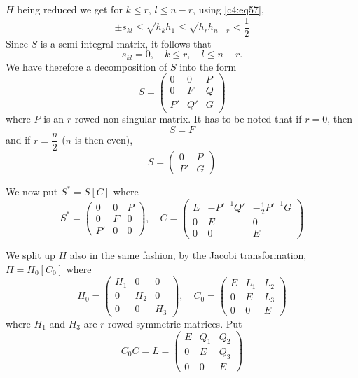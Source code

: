 $H$ being reduced we get for $k\leq r$, $l\leq n-r$, using \eqref{c4:eq57},
\begin{equation*}
\pm s_{kl}\leq \sqrt{h_{k}h_{1}}\leq
\sqrt{h_{r}h_{n-r}}<\frac{1}{2}\tag{58}\label{c4:eq58} 
\end{equation*}
Since $S$ is a semi-integral matrix, it follows that
$$
s_{kl}=0,\quad k\leq r,\quad l\leq n-r.
$$
We have therefore a decomposition of $S$ into the form
\begin{equation*}
S=
\begin{pmatrix}
0 & 0 & P\\
0 & F & Q\\
P' & Q' & G
\end{pmatrix}\tag{59}\label{c4:eq59}
\end{equation*}
where $P$ is an $r$-rowed non-singular matrix. It has to be noted that
if $r=0$, then
\begin{equation*}
S=F\tag{60}\label{c4:eq60}
\end{equation*}
and if $r=\dfrac{n}{2}$ ($n$ is then even),
\begin{equation*}
S=
\begin{pmatrix}
0 & P\\
P' & G
\end{pmatrix}\tag{61}\label{c4:eq61}
\end{equation*}\pageoriginale

We now put $S^{\ast}=S[C]$ where
\begin{equation*}
S^{\ast}=
\begin{pmatrix}
0 & 0 & P\\
0 & F & 0\\
P' & 0 & 0
\end{pmatrix},\quad
C=
\begin{pmatrix}
E & -{P'}^{-1}Q' & -\frac{1}{2}{P'}^{-1}G\\
0 & E & 0\\
0 & 0 & E
\end{pmatrix}\tag{62}\label{c4:eq62}
\end{equation*}

We split up $H$ also in the same fashion, by the Jacobi
transformation, $H=H_{0}[C_{0}]$ where
\begin{equation*}
H_{0}=
\begin{pmatrix}
H_{1} & 0 & 0\\
0 & H_{2} & 0\\
0 & 0 & H_{3}
\end{pmatrix},\quad
C_{0}=
\begin{pmatrix}
E & L_{1} & L_{2}\\
0 & E  & L_{3}\\
0 & 0 & E
\end{pmatrix}\tag{63}\label{c4:eq63}
\end{equation*}
where $H_{1}$ and $H_{3}$ are $r$-rowed symmetric matrices. Put
\begin{equation*}
C_{0}C=L=
\begin{pmatrix}
E & Q_{1} & Q_{2}\\
0 & E & Q_{3}\\
0 & 0 & E
\end{pmatrix}\tag{64}\label{c4:eq64}
\end{equation*}

